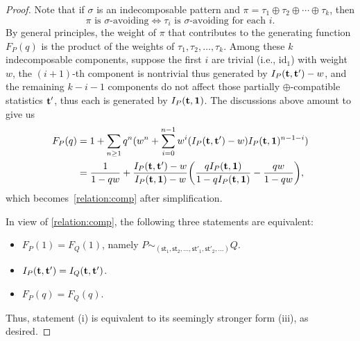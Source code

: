\documentclass[12pt]{amsart}
\numberwithin{equation}{section}
\theoremstyle{plain}
\theoremstyle{definition}
\def\st{\mathsf{st}}
\def\id{\mathrm{id}}
\begin{document}
\begin{proof}
Note that if $\sigma$ is an indecomposable pattern and $\pi=\tau_1\oplus\tau_2\oplus\cdots\oplus\tau_k$,  then
$$
\pi \text{ is $\sigma$-avoiding}\Longleftrightarrow \tau_i\text{ is $\sigma$-avoiding for each $i$}. 
$$
By general principles, the weight of $\pi$ that contributes to the generating function $F_P(q)$ is the product of the weights of $\tau_1,\tau_2,\ldots,\tau_k$. Among these $k$ indecomposable components, suppose the first $i$ are trivial (i.e., $\id_1$) with weight $w$, the $(i+1)$-th component is nontrivial thus generated by $I_P({\bf t},{\bf t'})-w$, and the remaining $k-i-1$ components do not affect those partially $\oplus$-compatible statistics ${\bf t'}$, thus each is generated by $I_P({\bf t},{\bf 1})$. The discussions above amount to give us 
\begin{align*}
F_P(q)&=1+\sum_{n\geq1} q^n(w^n+\sum_{i=0}^{n-1}w^i(I_P({\bf t}, {\bf t'})-w)I_P({\bf t},{\bf 1})^{n-1-i})\\
&=\frac{1}{1-qw}+\frac{I_P({\bf t}, {\bf t'})-w}{I_P({\bf t},{\bf 1})-w}\biggl(\frac{qI_P({\bf t},{\bf 1})}{1-qI_P({\bf t},{\bf 1})}-\frac{qw}{1-qw}\biggr),
\end{align*}
which becomes~\eqref{relation:comp}  after simplification.

In view of \eqref{relation:comp}, the following three statements are equivalent: 
\begin{itemize}
\item [(i)] $F_P(1)=F_Q(1)$, namely $P\sim_{(\st_1,\st_2,\ldots,\st'_1,\st'_2,\ldots)}Q$.
\item [(ii)] $I_P({\bf t}, {\bf t'})=I_Q({\bf t}, {\bf t'})$. 
\item [(iii)] $F_P(q)=F_Q(q)$. 
\end{itemize}
Thus, statement (i) is equivalent to its seemingly stronger form  (iii), as desired. 
\end{proof}
\end{document}
